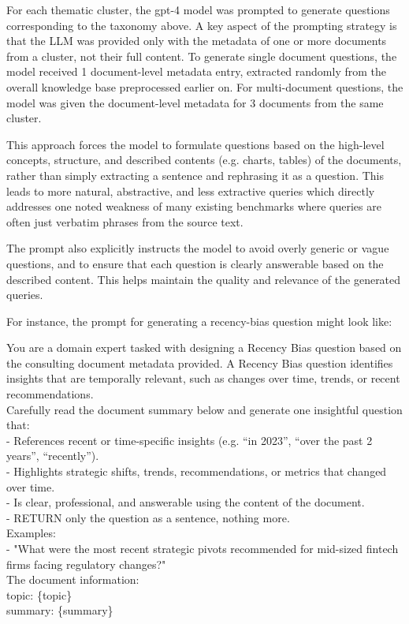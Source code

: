 \documentclass[12pt,twoside]{report}
\begin{document}
For each thematic cluster, the gpt-4 model was prompted to generate questions corresponding to the taxonomy above. A key aspect of the prompting strategy is that the LLM was provided only with the metadata of one or more documents from a cluster, not their full content. To generate single document questions, the model received 1 document-level metadata entry, extracted randomly from the overall knowledge base preprocessed earlier on. For multi-document questions, the model was given the document-level metadata for 3 documents from the same cluster.

This approach forces the model to formulate questions based on the high-level concepts, structure, and described contents (e.g. charts, tables) of the documents, rather than simply extracting a sentence and rephrasing it as a question. This leads to more natural, abstractive, and less extractive queries which directly addresses one noted weakness of many existing benchmarks where queries are often just verbatim phrases from the source text.

The prompt also explicitly instructs the model to avoid overly generic or vague questions, and to ensure that each question is clearly answerable based on the described content. This helps maintain the quality and relevance of the generated queries.

For instance, the prompt for generating a recency-bias question might look like:

\begin{colquote}
You are a domain expert tasked with designing a Recency Bias question based on the consulting document metadata provided. A Recency Bias question identifies insights that are temporally relevant, such as changes over time, trends, or recent recommendations. \\

Carefully read the document summary below and generate one insightful question that: \\
- References recent or time-specific insights (e.g. “in 2023”, “over the past 2 years”, “recently”). \\
- Highlights strategic shifts, trends, recommendations, or metrics that changed over time. \\
- Is clear, professional, and answerable using the content of the document. \\
- RETURN only the question as a sentence, nothing more. \\

Examples: \\
- "What were the most recent strategic pivots recommended for mid-sized fintech firms facing regulatory changes?" \\

The document information: \\

topic: \{topic\} \\

summary: \{summary\}
\end{colquote}
\end{document}
